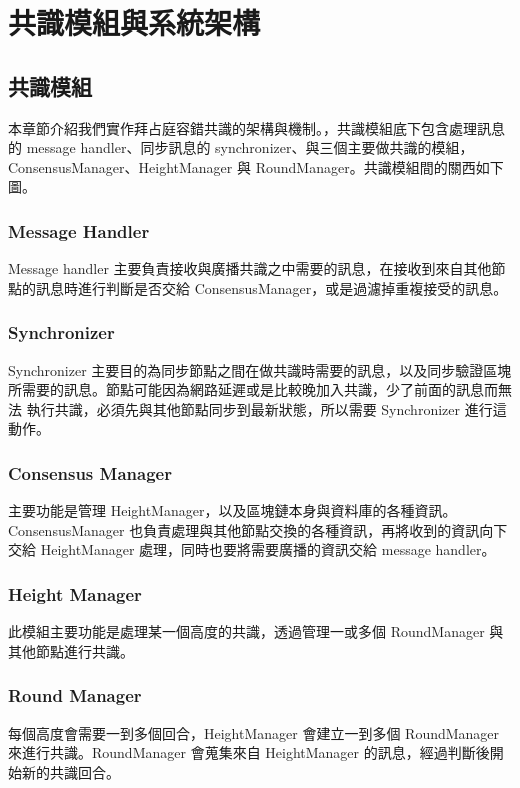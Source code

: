 \chapter{共識模組與系統架構}\label{se_5}

\section{共識模組}\label{se_5}
本章節介紹我們實作拜占庭容錯共識的架構與機制。，共識模組底下包含處理訊息的 message handler、同步訊息的 synchronizer、與三個主要做共識的模組， ConsensusManager、HeightManager 與 RoundManager。共識模組間的關西如下圖。




\subsection{Message Handler}\label{se_5} 
Message handler 主要負責接收與廣播共識之中需要的訊息，在接收到來自其他節 點的訊息時進行判斷是否交給 ConsensusManager，或是過濾掉重複接受的訊息。 
\subsection{Synchronizer}\label{se_5}
Synchronizer 主要目的為同步節點之間在做共識時需要的訊息，以及同步驗證區塊 所需要的訊息。節點可能因為網路延遲或是比較晚加入共識，少了前面的訊息而無法 執行共識，必須先與其他節點同步到最新狀態，所以需要 Synchronizer 進行這動作。  
\subsection{Consensus Manager}\label{se_5} 
主要功能是管理 HeightManager，以及區塊鏈本身與資料庫的各種資訊。 ConsensusManager 也負責處理與其他節點交換的各種資訊，再將收到的資訊向下 交給 HeightManager 處理，同時也要將需要廣播的資訊交給 message handler。
\subsection{Height Manager}\label{se_5}
此模組主要功能是處理某一個高度的共識，透過管理一或多個 RoundManager 與其他節點進行共識。
\subsection{Round Manager}\label{se_5}
每個高度會需要一到多個回合，HeightManager 會建立一到多個 RoundManager 來進行共識。RoundManager 會蒐集來自 HeightManager 的訊息，經過判斷後開始新的共識回合。




